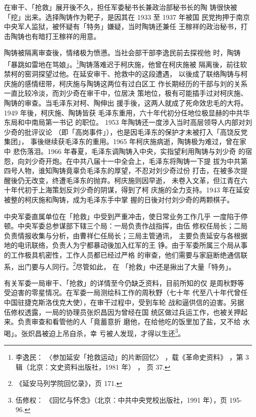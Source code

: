 在审干、「抢救」展开後不久，担任军委秘书长兼政治部秘书长的陶
铸很快被「挖」出来。选择陶铸作为靶子，是因其在 1933 至 1937 年被国
民党拘押于南京中央军人监狱，被怀疑有「特务」嫌疑，当时陶铸还兼任
王稼祥的政治秘书，打击陶铸也有暗打王稼祥的用意。

陶铸被隔离审查後，情绪极为愤懑。当社会部干部李逸民前去探视他
时，陶铸「暴跳如雷地在骂娘」。\footnote{李逸民：
〈参加延安「抢救运动」的片断回忆〉
，载《革命史资料》
，第 3 辑（北京：文史资料出版社，1981 年）
，
页 37.}陶铸落难迟于柯庆施，他曾在柯庆施被
隔离後，前往软禁柯的窑洞探望过他。在延安审干、抢救中的这段遭遇，
以後成了联络陶铸与柯庆施的感情纽带，柯庆施与陶铸这两位有过白区工
作长期经历的干部与刘的关系一直比较冷淡，而刘少奇在审干中，位居决
策地位，极有可能插手过对柯庆施、陶铸的审查。当毛泽东对柯、陶伸出
援手後，这两人就成了死命效忠毛的大将。1949 年後，柯庆施、陶铸皆获
毛泽东重用，六十年代初分任地位极显赫的中共华东局和中南局第一书记
的职位。
1953 年陶铸还一度涉入当时高层领导人内部对刘少奇的批评议论
（即「高岗事件」），也是因毛泽东的保护才未被打入「高饶反党集团」，
事後继续获毛泽东的重用。1965 年柯庆施病逝，陶铸极为难过，曾在家中
悲伤落泪。1966 年春夏，毛泽东调陶铸入中央，实指望利用陶铸与刘少奇
的宿怨，向刘少奇开炮。在中共八届十一中全会上，毛泽东将陶铸一下提
拔为中共第四号人物，谁知陶铸竟辜负毛泽东的厚望，不忍对刘少奇过份
打击，在被多次提醒後仍无改变，终遭毛泽东的抛弃。柯庆施则因早逝，
未卷入文革，但江青在六十年代初于上海策划反刘少奇的阴谋，得到了柯
庆施的全力支持。1943 年在延安被整的柯庆施和陶铸，成为毛泽东手中掌
握的日後对付刘少奇的两颗棋子。

中央军委直属单位在「抢救」中受到严重冲击，使日常业务工作几乎 一度陷于停
顿。中央军委总参谋部下辖三个局：一局负责作战指挥，由伍 修权任局长；二局
负责情报收集与分析，由曹祥仁任局长；三局主管通讯， 主要负责延安与各根据
地的电讯联络，负责人为宁都暴动後加入红军的王 铮。由于军委所属三个局从事
的工作极具机密性，工作人员都已经过严格 的审查，他们需要与家庭断绝通信联
系，出门要与人同行。\footnote{《延安马列学院回忆录》，页 171.}尽管如此，
在 「抢救」中还是揪出了大量「特务」。

有关军委一局审干、「抢救」的详情至今仍缺乏资料，目前所知的仅 是周秋野等
受迫害的零星情况。在军委一局测绘科工作的周秋野（七十年 代至八十年代曾任
中国驻捷克斯洛伐克大使），在审干过程中，受到车轮 战和逼供信的迫害。另据
伍修权透露，一局的协理员张炽昌因为曾经在国 统区做过兵运工作，也被关押起
来。负责审查和看管他的人「竟蓄意折 磨他，在给他吃的饭里加了盐，又不给
水喝」。张炽昌被迫上吊自杀，幸 亏被人发现，才得以生还\footnote{伍修权：
《回忆与怀念》（北京：中共中央党校出版社，1991 年），页 195-96.}。


